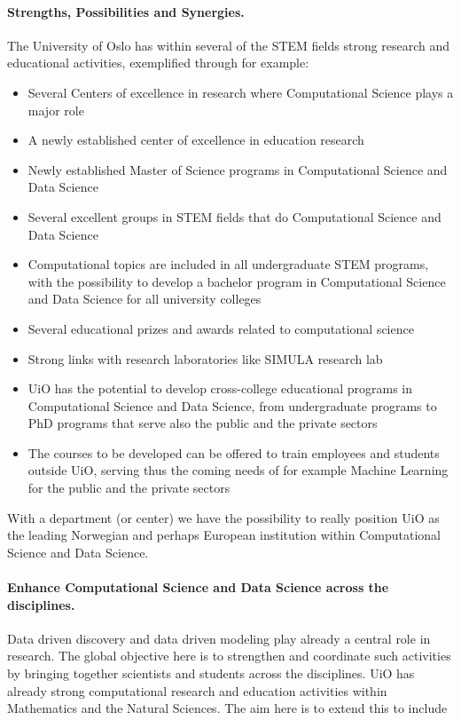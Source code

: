 \documentclass[%
oneside,                 %
final,                   %
10pt]{article}
\begin{document}
\paragraph{Strengths, Possibilities and Synergies.}
The University of Oslo has within several of the STEM fields strong research and educational activities, exemplified through for example:
\begin{itemize}
\item Several Centers of excellence in research where Computational Science plays a major role

\item A newly established center of excellence in education research

\item Newly established Master of Science programs in Computational Science and Data Science

\item Several excellent groups in STEM fields that do Computational Science and Data Science

\item Computational topics are included in all undergraduate STEM programs, with the possibility to develop a bachelor program in Computational Science and Data Science for all university colleges

\item Several educational prizes and awards related to computational science 

\item Strong links with research laboratories like SIMULA research lab

\item UiO has the potential to develop cross-college educational programs in Computational Science and Data Science, from undergraduate programs to PhD programs that serve also the public and the private sectors

\item The courses to be developed can be offered to train employees and students outside UiO, serving thus the coming needs of for example Machine Learning for the public and the private sectors
\end{itemize}

\noindent
With a department (or center) we have the possibility to really position UiO as the leading Norwegian and perhaps European institution within Computational Science and Data Science.



\paragraph{Enhance Computational Science and Data Science across the disciplines.}
Data driven discovery and data driven modeling play already a central role in research. The global objective here is to strengthen and coordinate such activities by bringing together scientists and students across the disciplines.
UiO has already strong computational research and education activities within Mathematics and the Natural Sciences.
The aim here is to extend this to include
\end{document}
